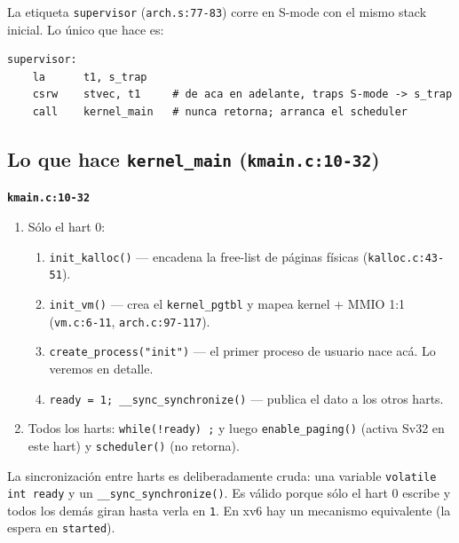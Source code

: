 \documentclass[11pt,a4paper]{article}
\begin{document}
La etiqueta \texttt{supervisor} (\texttt{arch.s:77-83}) corre en
S-mode con el mismo stack inicial. Lo único que hace es:

\begin{lstlisting}[style=asmstyle]
supervisor:
    la      t1, s_trap
    csrw    stvec, t1     # de aca en adelante, traps S-mode -> s_trap
    call    kernel_main   # nunca retorna; arranca el scheduler
\end{lstlisting}

\subsection{Lo que hace \texttt{kernel\_main} (\texttt{kmain.c:10-32})}

\begin{walkthrough}
\textbf{\texttt{kmain.c:10-32}}

\begin{enumerate}[leftmargin=*,nosep,label=\arabic*.]
    \item Sólo el hart 0:
        \begin{enumerate}[nosep,label=\alph*)]
            \item \texttt{init\_kalloc()} — encadena la free-list
                de páginas físicas (\texttt{kalloc.c:43-51}).
            \item \texttt{init\_vm()} — crea el \texttt{kernel\_pgtbl}
                y mapea kernel + MMIO 1:1 (\texttt{vm.c:6-11},
                \texttt{arch.c:97-117}).
            \item \texttt{create\_process("init")} — el primer
                proceso de usuario nace acá. Lo veremos en detalle.
            \item \texttt{ready = 1; \_\_sync\_synchronize()} —
                publica el dato a los otros harts.
        \end{enumerate}
    \item Todos los harts: \texttt{while(!ready) ;} y luego
        \texttt{enable\_paging()} (activa Sv32 en este hart) y
        \texttt{scheduler()} (no retorna).
\end{enumerate}
\end{walkthrough}

\begin{idea}
La sincronización entre harts es deliberadamente cruda: una variable
\texttt{volatile int ready} y un \texttt{\_\_sync\_synchronize()}.
Es válido porque sólo el hart 0 escribe y todos los demás giran
hasta verla en \texttt{1}. En xv6 hay un mecanismo equivalente
(la espera en \texttt{started}).
\end{idea}
\end{document}
